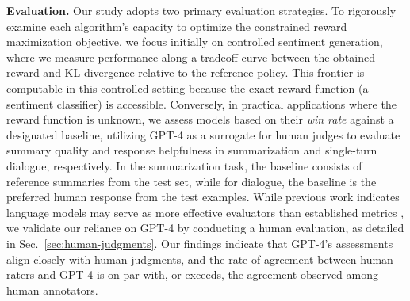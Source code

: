 \textbf{Evaluation.} Our study adopts two primary evaluation strategies. To rigorously examine each algorithm’s capacity to optimize the constrained reward maximization objective, we focus initially on controlled sentiment generation, where we measure performance along a tradeoff curve between the obtained reward and KL-divergence relative to the reference policy. This frontier is computable in this controlled setting because the exact reward function (a sentiment classifier) is accessible. Conversely, in practical applications where the reward function is unknown, we assess models based on their \textit{win rate} against a designated baseline, utilizing GPT-4 as a surrogate for human judges to evaluate summary quality and response helpfulness in summarization and single-turn dialogue, respectively. In the summarization task, the baseline consists of reference summaries from the test set, while for dialogue, the baseline is the preferred human response from the test examples. While previous work indicates language models may serve as more effective evaluators than established metrics \citep{Chen2023ExploringTU}, we validate our reliance on GPT-4 by conducting a human evaluation, as detailed in Sec.~\ref{sec:human-judgments}. Our findings indicate that GPT-4’s assessments align closely with human judgments, and the rate of agreement between human raters and GPT-4 is on par with, or exceeds, the agreement observed among human annotators.

